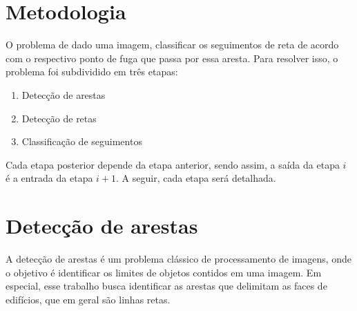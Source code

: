 \documentclass[12pt]{article}
\begin{document}








\newpage
\section{Metodologia}

O problema de dado uma imagem, classificar os seguimentos de reta de acordo com o respectivo ponto de fuga que passa por essa aresta. Para resolver isso, o problema foi subdividido em três etapas:

\begin{enumerate}
\item Detecção de arestas
\item Detecção de retas
\item Classificação de seguimentos
\end{enumerate}

Cada etapa posterior depende da etapa anterior, sendo assim, a saída da etapa $i$ é a entrada da etapa $i+1$. A seguir, cada etapa será detalhada.

\section{Detecção de arestas}

A detecção de arestas é um problema clássico de processamento de imagens, onde o objetivo é identificar os limites de objetos contidos em uma imagem. Em especial, esse trabalho busca identificar as arestas que delimitam as faces de edifícios, que em geral são linhas retas. 
\end{document}

